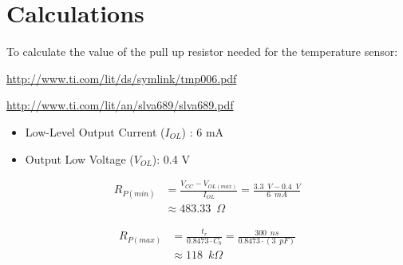 \documentclass{article}
\begin{document}
\section*{Calculations}
To calculate the value of the pull up resistor needed for the temperature sensor:

\url{http://www.ti.com/lit/ds/symlink/tmp006.pdf}

\url{http://www.ti.com/lit/an/slva689/slva689.pdf}


\begin{itemize}
    \item Low-Level Output Current ($I_{OL}$) : 6 mA
    \item Output Low Voltage ($V_{OL}$): 0.4 V
\end{itemize}

\begin{align*}
    R_{P(min)} & = \frac{V_{CC} - V_{OL(max)}}{I_{OL}} 
               = \frac{ 3.3 \enspace V - 0.4 \enspace V }{6 \enspace mA} \\
               & \approx 483.33 \enspace \Omega
\end{align*}

\begin{align*}
    R_{P(max)} & = \frac{t_r}{0.8473 \cdot C_b} 
                 = \frac{300 \enspace ns}{0.8473 \cdot (3 \enspace pF)} \\
               & \approx 118 \enspace k\Omega
\end{align*}

\end{document}
